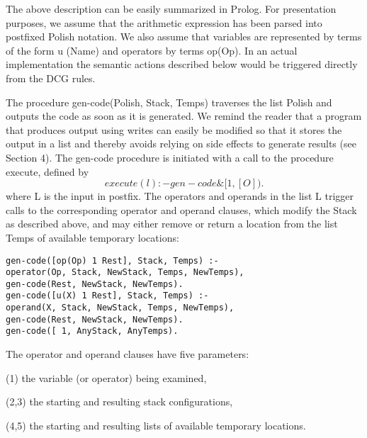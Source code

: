 The above description can be easily summarized in Prolog. For presentation
purposes, we assume that the arithmetic expression has been parsed into postfixed
Polish notation. We also assume that variables are represented by terms of the
form u (Name) and operators by terms op(Op). In an actual implementation the
semantic actions described below would be triggered directly from the DCG rules. 

The procedure gen-code(Polish, Stack, Temps) traverses the list Polish and
outputs the code as soon as it is generated. We remind the reader that a program
that produces output using writes can easily be modified so that it stores the
output in a list and thereby avoids relying on side effects to generate results (see
Section 4). The gen-code procedure is initiated with a call to the procedure
execute, defined by
\[execute(l) :- gen-code\& [ 1, [O]).\]
where L is the input in postfix. The operators and operands in the list L trigger
calls to the corresponding operator and operand clauses, which modify the Stack
as described above, and may either remove or return a location from the list 
Temps of available temporary locations:
\begin{verbatim}
gen-code([op(Op) 1 Rest], Stack, Temps) :-
operator(Op, Stack, NewStack, Temps, NewTemps),
gen-code(Rest, NewStack, NewTemps).
gen-code([u(X) 1 Rest], Stack, Temps) :-
operand(X, Stack, NewStack, Temps, NewTemps),
gen-code(Rest, NewStack, NewTemps).
gen-code([ 1, AnyStack, AnyTemps). 
\end{verbatim}

The operator and operand clauses have five parameters:

(1) the variable (or operator) being examined,

(2,3) the starting and resulting stack configurations,

(4,5) the starting and resulting lists of available temporary locations. 

